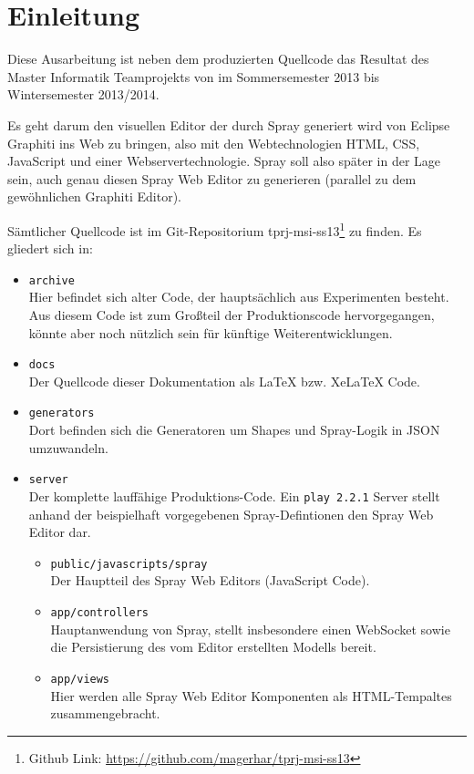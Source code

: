 \section{Einleitung}

Diese Ausarbeitung ist neben dem produzierten Quellcode das Resultat des
Master Informatik Teamprojekts von \autor im Sommersemester 2013 bis
Wintersemester 2013/2014.

Es geht darum den visuellen Editor der durch Spray generiert wird
von Eclipse Graphiti ins Web zu bringen, also mit den Webtechnologien
HTML, CSS, JavaScript und einer Webservertechnologie.
Spray soll also später in der Lage sein, auch genau diesen Spray
Web Editor zu generieren (parallel zu dem gewöhnlichen Graphiti Editor).

Sämtlicher Quellcode ist im Git-Repositorium
tprj-msi-ss13\footnote{Github Link: \url{https://github.com/magerhar/tprj-msi-ss13}} zu finden.
Es gliedert sich in:

\begin{itemize}
  \item {\tt archive} \\
  Hier befindet sich alter Code, der hauptsächlich aus Experimenten besteht.
  Aus diesem Code ist zum Großteil der Produktionscode hervorgegangen,
  könnte aber noch nützlich sein für künftige Weiterentwicklungen.
  \item {\tt docs} \\
  Der Quellcode dieser Dokumentation als LaTeX bzw. XeLaTeX Code.
  \item {\tt generators} \\
  Dort befinden sich die Generatoren um Shapes und Spray-Logik in JSON umzuwandeln.
  \item {\tt server} \\
  Der komplette lauffähige Produktions-Code.
  Ein {\tt play 2.2.1} Server stellt anhand der beispielhaft vorgegebenen
  Spray-Defintionen den Spray Web Editor dar.
  \begin{itemize}
    \item {\tt public/javascripts/spray} \\
    Der Hauptteil des Spray Web Editors (JavaScript Code).
    \item {\tt app/controllers} \\
    Hauptanwendung von Spray, stellt insbesondere einen WebSocket sowie die
    Persistierung des vom Editor erstellten Modells bereit.
    \item {\tt app/views} \\
    Hier werden alle Spray Web Editor Komponenten als HTML-Tempaltes zusammengebracht.
  \end{itemize}
\end{itemize}

